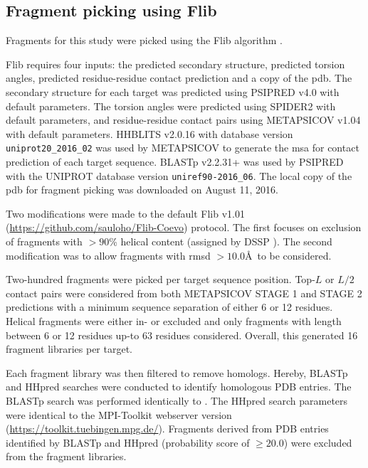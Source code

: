 \subsection{Fragment picking using Flib}
Fragments for this study were picked using the Flib algorithm \cite{De_Oliveira2015-ba}. 

Flib requires four inputs: the predicted secondary structure, predicted torsion angles, predicted residue-residue contact prediction and a copy of the \gls{pdb}. The secondary structure for each target was predicted using PSIPRED v4.0 \cite{Jones1999-fi} with default parameters. The torsion angles were predicted using SPIDER2 \cite{Heffernan2015-wp} with default parameters, and residue-residue contact pairs using METAPSICOV v1.04 \cite{Jones2015-wp} with default parameters. HHBLITS v2.0.16 \cite{Remmert2011-ze} with database version \texttt{uniprot20\_2016\_02} was used by METAPSICOV to generate the \gls{msa} for contact prediction of each target sequence. BLASTp v2.2.31+ was used by PSIPRED with the UNIPROT database version \texttt{uniref90-2016\_06}. The local copy of the \gls{pdb} for fragment picking was downloaded on August 11, 2016.

Two modifications were made to the default Flib v1.01 (\url{https://github.com/sauloho/Flib-Coevo}) protocol. The first focuses on exclusion of fragments with $>90$\% helical content (assigned by DSSP \cite{Frishman1995-ns}). The second modification was to allow fragments with \gls{rmsd} $>10.0$\AA\ to be considered.

Two-hundred fragments were picked per target sequence position. Top-$L$ or $L/2$ contact pairs were considered from both METAPSICOV STAGE 1 and STAGE 2 predictions with a minimum sequence separation of either 6 or 12 residues. Helical fragments were either in- or excluded and only fragments with length between 6 or 12 residues up-to 63 residues considered. Overall, this generated 16 fragment libraries per target.

Each fragment library was then filtered to remove homologs. Hereby, BLASTp \cite{Altschul1990-nc} and HHpred \cite{Soding2005-sx} searches were conducted to identify homologous PDB entries. The BLASTp search was performed identically to \cite{De_Oliveira2015-ba}. The HHpred search parameters were identical to the MPI-Toolkit \cite{Biegert2006-ny} webserver version (\url{https://toolkit.tuebingen.mpg.de/}). Fragments derived from PDB entries identified by BLASTp and HHpred (probability score of $\geq20.0$) were excluded from the fragment libraries.

